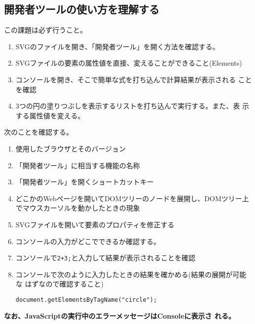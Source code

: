 \documentclass[a4j]{jarticle}
\begin{document}
\subsection{開発者ツールの使い方を理解する}
この課題は必ず行うこと。
\begin{enumerate}
 \item SVGのファイルを開き、「開発者ツール」を開く方法を確認する。
 \item SVGファイルの要素の属性値を直接、変えることができること(Elements)
 \item コンソールを開き、そこで簡単な式を打ち込んで計算結果が表示される
       ことを確認
 \item 3つの円の塗りつぶしを表示するリストを打ち込んで実行する。また、表
       示する属性値を変える。
\end{enumerate}
次のことを確認する。
 \begin{enumerate}
  \item 使用したブラウザとそのバージョン
  \item 「開発者ツール」に相当する機能の名称
  \item 「開発者ツール」を開くショートカットキー
  \item どこかのWebページを開いてDOMツリーのノードを展開し、DOMツリー上
        でマウスカーソルを動かしたときの現象
  \item SVGファイルを開いて要素のプロパティを修正する
  \item コンソールの入力がどこでできるか確認する。
  \item コンソールで\texttt{2+3;}と入力して結果が表示されることを確認
  \item コンソールで次のように入力したときの結果を確かめる(結果の展開が可能な
        はずなので確認すること)

        \texttt{document.getElementsByTagName("circle");}
 \end{enumerate}
 {\bfseries なお、JavaScriptの実行中のエラーメッセージはConsoleに表示さ
 れる。}
\end{document}
